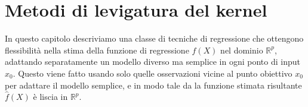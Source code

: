 \documentclass[11pt,openany]{book}
\begin{document}
\tableofcontents

\chapter{Metodi di levigatura del kernel}

In questo capitolo descriviamo una classe di tecniche di regressione che ottengono flessibilità nella stima della funzione di regressione $f(X)$ nel dominio $\mathbb{R}^p$, adattando separatamente un modello diverso ma semplice in ogni ponto di input $x_0$. Questo viene fatto usando solo quelle osservazioni vicine al punto obiettivo $x_0$ per adattare il modello semplice, e in modo tale da la funzione stimata risultante $\hat{f}(X)$ è liscia in $\mathbb{R}^p$. 

\subsection{}


\end{document}
